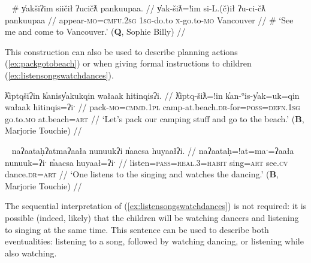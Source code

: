 \ex~ \label{ex:cometovancouver2}
\begingl
\glpreamble \# y̓akšiʔim siičił ʔucičƛ pankuupaa. //
\gla y̓ak-šiƛ=!im si-L.(č)ił ʔu-ci-čƛ pankuupaa //
\glb appear-\textsc{mo}=\textsc{cmfu.2sg} \textsc{1sg}-do.to \textsc{x}-go.to-\textsc{mo} Vancouver //
\glft \# `See me and come to Vancouver.' (\textbf{Q}, Sophie Billy) //
\endgl
\xe

This construction can also be used to describe planning actions (\ref{ex:packgotobeach}) or when giving formal instructions to children (\ref{ex:listensongswatchdances}).%

\ex \label{ex:packgotobeach}
\begingl
\glpreamble ƛ̓iptqšiʔin k̓anisy̓akukqin wałaak hitinqisʔi. //
\gla ƛ̓iptq-šiƛ=!in k̓an-°is-y̓ak=uk=qin wałaak hitinqis=ʔiˑ //
\glb pack-\textsc{mo}=\textsc{cmmd.1pl} camp-at.beach.\textsc{dr}-for=\textsc{poss}=\textsc{defn.1sg} go.to.\textsc{mo} at.beach=\textsc{art} //
\glft `Let's pack our camping stuff and go to the beach.' (\textbf{B}, Marjorie Touchie) //
\endgl
\xe

\ex~ \label{ex:listensongswatchdances}
\begingl
\glpreamble naʔaataḥʔatmaʔaała nunuukʔi n̓aacsa huyaałʔi. //
\gla naʔaataḥ=!at=maˑ=ʔaała nunuuk=ʔiˑ n̓aacsa huyaał=ʔiˑ //
\glb listen=\textsc{pass}=\textsc{real.3}=\textsc{habit} sing=\textsc{art} see.\textsc{cv} dance.\textsc{dr}=\textsc{art} //
\glft `One listens to the singing and watches the dancing.' (\textbf{B}, Marjorie Touchie) //
\endgl
\xe

The sequential interpretation of (\ref{ex:listensongswatchdances}) is not required: it is possible (indeed, likely) that the children will be watching dancers and listening to singing at the same time. This sentence can be used to describe both eventualities: listening to a song, followed by watching dancing, or listening while also watching.

\begin{comment}
It is possible for both verbs in this kind of SVC to share a single direct object. [[Comment: Below be recategorized as Type I?]]

recast the below

\ex \label{ex:listenrespect}
\begingl
\glpreamble naʔaataḥʔaqƛ̓iʔaał ʔiisaak ʔuukʷił ʔaʔiič̓um. //
\gla naʔaataḥ=!aqƛ=!iˑ=ʔaał ʔiisaak ʔu-L.(č)ił ʔaʔiič̓um //
\glb listen.\textsc{dr}=\textsc{fut}=\textsc{cmmd.2sg}=\textsc{habit} respect.\textsc{dr} \textsc{x}-do.to elder.\textsc{pl} //
\glft `Listen to and respect the elders.' (\textbf{C}, \textit{tupaat} Julia Lucas) //
\endgl
\xe


\end{comment}

